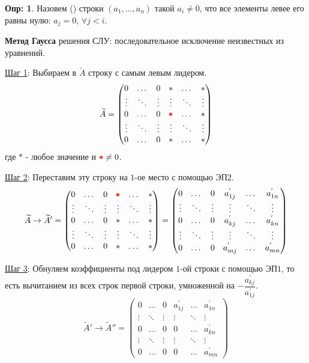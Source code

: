 \documentclass[12pt]{article}
\theoremstyle{definition}
\newtheorem{defn}{Опр:}
\newcommand{\wte}[1]{\widetilde{#1}}
\begin{document}
\begin{defn}
	Назовем  () строки $(a_1,\dotsc, a_n)$ такой $a_i \neq 0$, что все элементы левее его равны нулю: $a_j = 0, \, \forall j < i$. 
\end{defn}

\textbf{Метод Гаусса} решения СЛУ: последовательное исключение неизвестных из уравнений.

\uline{Шаг 1}: Выбираем в $\wte{A}$ строку с самым левым лидером. 
$$
\wte{A} = \begin{pmatrix}
	0 & \dotsc & 0 &  * & \dotsc & *\\
	\vdots & \ddots &\vdots & \vdots & \ddots & \vdots \\
	0 & \dotsc & 0 & {\color{red}\pmb{*}} & \dotsc & * \\
	\vdots & \ddots & \vdots & \vdots & \ddots & \vdots \\
		0 & \dotsc & 0 & * & \dotsc & *
\end{pmatrix}
$$
где $*$ - любое значение и ${\color{red}\pmb{*}} \neq 0$.

\uline{Шаг 2}: Переставим эту строку на $1$-ое место с помощью ЭП$2$.
$$
	\wte{A} \to \wte{A}' = \begin{pmatrix}
		0 & \dotsc & 0 & {\color{red}\pmb{*}} & \dotsc & * \\
		\vdots & \ddots &\vdots & \vdots & \ddots & \vdots \\
		0 & \dotsc & 0 &  * & \dotsc & *\\
		\vdots & \ddots & \vdots & \vdots & \ddots & \vdots \\
		0 & \dotsc & 0 & * & \dotsc & *
	\end{pmatrix} = 	\begin{pmatrix}
	0 & \dotsc & 0 & a_{1j}^{'} & \dotsc & a_{1n}^{'} \\
	\vdots & \ddots &\vdots & \vdots & \ddots & \vdots \\
	0 & \dotsc & 0 &  a_{kj}^{'} & \dotsc & a_{kn}^{'}\\
	\vdots & \ddots & \vdots & \vdots & \ddots & \vdots \\
	0 & \dotsc & 0 & a_{mj}^{'} & \dotsc & a_{mn}^{'}
\end{pmatrix}
$$

\uline{Шаг 3}: Обнуляем коэффициенты под лидером $1$-ой строки с помощью ЭП$1$, то есть вычитанием из всех строк первой строки, умноженной на  $-\dfrac{ a_{kj}^{'}}{a_{1j}^{'}}$.
$$
\wte{A}' \to \wte{A}'' = 	\begin{pmatrix}
	0 & \dotsc & 0 & a_{1j}^{'} & \dotsc & a_{1n}^{'} \\
	\vdots & \ddots &\vdots & \vdots & \ddots & \vdots \\
	0 & \dotsc & 0 &  0 & \dotsc & a_{kn}^{'}\\
	\vdots & \ddots & \vdots & \vdots & \ddots & \vdots \\
	0 & \dotsc & 0 & 0 & \dotsc & a_{mn}^{'}
\end{pmatrix}
$$
\end{document}
